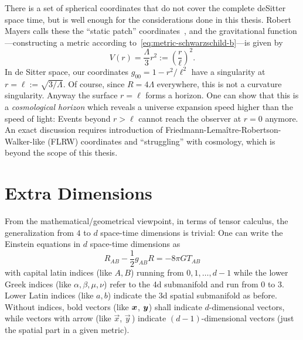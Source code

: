 \documentclass[12pt,a4paper]{report}
\numberwithin{equation}{chapter}
\begin{document}
There is a set of spherical coordinates that do not cover the complete deSitter space time, but is well enough for the considerations done in this thesis. Robert Mayers calls these the  ``static patch'' coordinates~\cite{tales-deSitter}, and the gravitational function---constructing a metric according to~\eqref{eq:metric-schwarzschild-b}---is given by
\begin{equation}\label{eq:desitter-definition}
V(r) = \frac{\Lambda}{3} r^2 := \left(\frac r\ell \right)^2.
\end{equation}
In de Sitter space, our coordinates $g_{00} = 1 - r^2/\ell^2$ have a singularity at $r=\ell:=\sqrt{3/\Lambda}$. Of course, since $R=4\Lambda$ everywhere, this is not a curvature singularity. Anyway the surface $r=\ell$ forms a horizon. One can show that this is a \emph{cosmological horizon} \cite{griffiths2009exact} which reveals a universe expansion speed higher than the speed of light: Events beyond $r>\ell$ cannot reach the observer at $r=0$ anymore. An exact discussion requires introduction of Friedmann-Lemaître-Robertson-Walker-like (FLRW) coordinates and ``struggling'' with cosmology, which is beyond the scope of this thesis.

\newpage
\section{Extra Dimensions}\label{sec:extra-dimensions}
From the mathematical/geometrical viewpoint, in terms of tensor calculus, the generalization from $4$ to $d$ space-time dimensions is trivial: One can write the Einstein equations in $d$ space-time dimensions as
\begin{equation}\label{eq:higher-dim-efe}
R_{AB} - \frac 12 g_{AB} R = -8\pi G T_{AB}
\end{equation}
with capital latin indices (like $A, B$) running from $0,1,\dots, d-1$ while the lower Greek indices (like $\alpha, \beta, \mu, \nu$) refer to the 4d submanifold and run from $0$ to $3$. Lower Latin indices (like $a,b$) indicate the 3d spatial submanifold as before. Without indices, bold vectors (like $\boldsymbol{ x }$, $\boldsymbol{ y }$) shall indicate $d$-dimensional vectors, while vectors with arrow (like $\vec x$, $\vec y\,$) indicate $(d-1)$-dimensional vectors (just the spatial part in a given metric).
\end{document}
